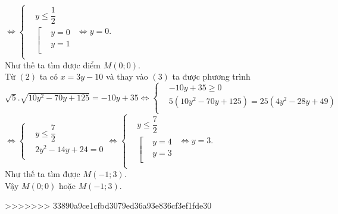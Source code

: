 \begin{ex}
{			$\Leftrightarrow \left\{ \begin{aligned}
				& y\le \dfrac{1}{2} \\ 
				& \left[ \begin{aligned}
					& y=0 \\ 
					& y=1 \\ 
				\end{aligned} \right. \\ 
			\end{aligned} \right.\Leftrightarrow y=0$.\\
			Như thế ta tìm được điểm $M\left( 0;0 \right)$.\\
			Từ $\left( 2 \right)$ ta có $ x=3y-10$ và thay vào $\left( 3 \right)$ ta được phương trình\\
			$\sqrt{5}.\sqrt{10y^2-70y+125}=-10y+35\Leftrightarrow \left\{ \begin{aligned}
				& -10y+35\ge 0 \\ 
				& 5\left( 10y^2-70y+125 \right)=25\left( 4y^2-28y+49 \right) \\ 
			\end{aligned} \right.$\\
			$\Leftrightarrow \left\{ \begin{aligned}
				& y\le \dfrac{7}{2} \\ 
				& 2y^2-14y+24=0 \\ 
			\end{aligned} \right.\Leftrightarrow \left\{ \begin{aligned}
				& y\le \dfrac{7}{2} \\ 
				& \left[ \begin{aligned}
					& y=4 \\ 
					& y=3 \\ 
				\end{aligned} \right. \\ 
			\end{aligned} \right.\Leftrightarrow y=3$.\\
			Như thế ta tìm được $M\left( -1;3 \right)$.\\
			Vậy $M\left( 0;0 \right)$ hoặc $M\left( -1;3 \right)$.}
	\end{ex}
>>>>>>> 33890a9ce1cfbd3079ed36a93e836cf3ef1fde30
